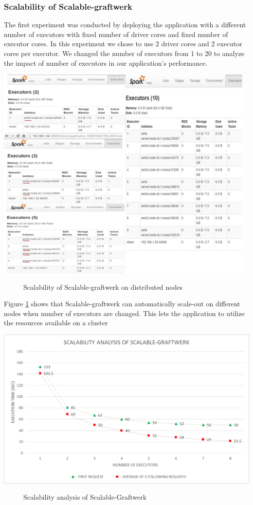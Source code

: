 \subsubsection{Scalability of Scalable-graftwerk}
\label{scalability-exp}
The first experiment was conducted by deploying the application with a different number of executors with fixed number of driver cores and fixed number of executor cores. In this experiment we chose to use 2 driver cores and 2 executor cores per executor. We changed the number of executors from 1 to 20 to analyze the impact of number of executors in our application's performance. 
\begin{center}
	\includegraphics[width=35em]{./Figures/scale}
	\begin{figure}[htbp]
    \caption{Scalability of Scalable-graftwerk on distributed nodes}
    \label{fig:scale}
	\end{figure}
\end{center}
Figure \ref{fig:scale} shows that Scalable-graftwerk can automatically scale-out on different nodes when number of executors are changed. This lets the application to utilize the resources available on a cluster
\begin{center}
	\includegraphics[width=38em]{./Figures/executors2}
	\begin{figure}[htbp]
    \caption{Scalability analysis of Scalable-Graftwerk}
    \label{fig:executors}
	\end{figure}
\end{center}
